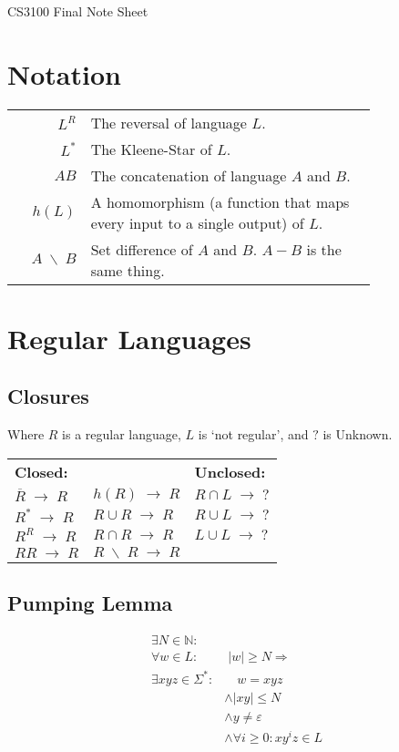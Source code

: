\documentclass[10pt,landscape]{article}
\newcommand{\spto}{\;\to\;}
\newcommand{\spbackslash}{\;\backslash\;}
\newcommand{\impl}{\Rightarrow}
\newlength{\templength}
\begin{document}
\begin{multicols*}{3}

\begin{center}
    \Large CS3100 Final Note Sheet
\end{center}

\section{Notation}
\begin{tabular}{rp{0.79\linewidth}}
$L^R$ & The reversal of language $L$. \\
$L^*$ & The Kleene-Star of $L$. \\
$AB$ & The concatenation of language $A$ and $B$. \\
$h(L)$ & A homomorphism (a function that maps every input to 
         a single output) of $L$. \\
$A \spbackslash B$ & Set difference of $A$ and $B$. $A - B$ is the same thing. \\
\end{tabular}

\section{Regular Languages}

\subsection{Closures}
Where $R$ is a regular language, $L$ is `not regular', and $?$ is Unknown.

\settowidth{\templength}{$R \cap R \spto R$}
\addtolength{\templength}{1cm}
\begin{tabular}{lp{\templength}l}
\textbf{Closed:}       &                    & \textbf{Unclosed:} \\
$\overline{R} \spto R$ & $h(R) \spto R$     & $R \cap L \spto ?$ \\
$R^* \spto R$          & $R \cup R \spto R$ & $R \cup L \spto ?$\\
$R^R \spto R$          & $R \cap R \spto R$ & $L \cup L \spto ?$\\
$RR \spto R$           & $R \spbackslash R \spto R$ & \\
\end{tabular}

\subsection{Pumping Lemma}
\begin{align*}
\exists N \in \mathbb{N}: & \\
         \forall w \in L: &\; |w| \geq N \impl \\
\exists xyz \in \Sigma^*: & \quad w = xyz \\
                          & \land |xy| \leq N \\
                          & \land y \neq \varepsilon \\
                          & \land \forall i \geq 0: xy^iz \in L
\end{align*}


\end{multicols*}
\end{document}
